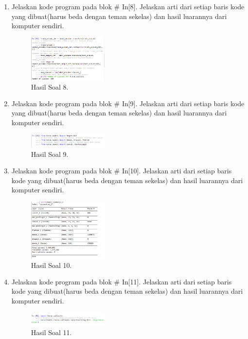 \begin{enumerate}
	\item Jelaskan kode program pada blok \# In[8]. Jelaskan arti dari setiap baris kode yang dibuat(harus beda dengan teman sekelas) dan hasil luarannya dari komputer sendiri.
	\hfill\break
	
	\begin{figure}[H]
	\centering
		\includegraphics[width=4cm]{figures/1174096/tugas7/praktek_8.PNG}
		\caption{Hasil Soal 8.}
	\end{figure}

	\item Jelaskan kode program pada blok \# In[9]. Jelaskan arti dari setiap baris kode yang dibuat(harus beda dengan teman sekelas) dan hasil luarannya dari komputer sendiri.
	\hfill\break
	
	\begin{figure}[H]
	\centering
		\includegraphics[width=4cm]{figures/1174096/tugas7/praktek_9.PNG}
		\caption{Hasil Soal 9.}
	\end{figure}

	\item Jelaskan kode program pada blok \# In[10]. Jelaskan arti dari setiap baris kode yang dibuat(harus beda dengan teman sekelas) dan hasil luarannya dari komputer sendiri.
	\hfill\break
	
	\begin{figure}[H]
	\centering
		\includegraphics[width=4cm]{figures/1174096/tugas7/praktek_10.PNG}
		\caption{Hasil Soal 10.}
	\end{figure}

	\item Jelaskan kode program pada blok \# In[11]. Jelaskan arti dari setiap baris kode yang dibuat(harus beda dengan teman sekelas) dan hasil luarannya dari komputer sendiri.
	\hfill\break
	
	\begin{figure}[H]
	\centering
		\includegraphics[width=4cm]{figures/1174096/tugas7/praktek_11.PNG}
		\caption{Hasil Soal 11.}
    \end{figure}
    

\end{enumerate}
